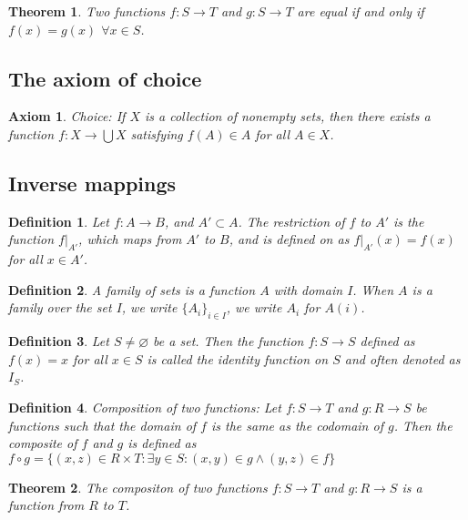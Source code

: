 \documentclass[a4paper]{article}
\newtheorem{mytheorem}{Theorem}
\newtheorem{axiom}{Axiom}
\newtheorem{mydef}{Definition}
\numberwithin{mytheorem}{section}
\numberwithin{mydef}{section}
\numberwithin{axiom}{section}
\numberwithin{example}{section}
\begin{document}
\begin{mytheorem} Two functions $f: S \rightarrow T$ and $g: S \rightarrow T$ are equal if and only if $f(x) = g(x)$ $\forall x \in S$.
\end{mytheorem}


\subsection{The axiom of choice}

\begin{axiom} Choice:  If $X$ is a collection of nonempty sets, then there exists a function $f: X \rightarrow \bigcup X$ satisfying $f(A) \in A$ for all $A \in X$.
\end{axiom}

\subsection{Inverse mappings}

\begin{mydef} Let $f: A \rightarrow B$, and $A' \subset A$. The restriction of $f$ to $A'$ is the function $f|_{A'}$, which maps from $A'$ to $B$, and is defined on as $f|_{A'}(x) = f(x)$ for all $x \in A'$.
\end{mydef}

\begin{mydef} A family of sets is a function $A$ with domain $I$. When $A$ is a family over the set $I$, we write $\{A_{i}\}_{i \in I}$, we write $A_{i}$ for $A(i)$.
\end{mydef}

\begin{mydef} Let $S \neq \varnothing$ be a set. Then the function $f: S \rightarrow S$ defined as $f(x) = x$ for all $x \in S$ is called the identity function on $S$ and often denoted as $I_{S}$.
\end{mydef}

\begin{mydef} Composition of two functions: Let $f: S \rightarrow T$ and $g: R \rightarrow S$ be functions such that the domain of $f$ is the same as the codomain of $g$. Then the composite of $f$ and $g$ is defined as $f \circ g = \{ (x,z) \in R \times T : \exists y \in S : (x,y) \in g \wedge (y,z) \in f \} $
\end{mydef}

\begin{mytheorem} The compositon of two functions $f: S \rightarrow T$ and $g: R \rightarrow S$ is a function from $R$ to $T$.
\end{mytheorem}
\end{document}
